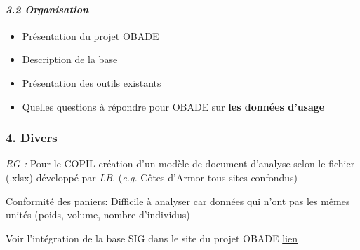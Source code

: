 \documentclass[
]{article}
\providecommand{\tightlist}{%
  \setlength{\itemsep}{0pt}\setlength{\parskip}{0pt}}
\begin{document}
\hypertarget{organisation}{%
\paragraph{\texorpdfstring{\emph{3.2
Organisation}}{3.2 Organisation}}\label{organisation}}

\begin{itemize}
\tightlist
\item
  Présentation du projet OBADE
\item
  Description de la base
\item
  Présentation des outils existants
\item
  Quelles questions à répondre pour OBADE sur \textbf{les données
  d'usage}
\end{itemize}

\hypertarget{divers}{%
\subsubsection{\texorpdfstring{\textbf{4.
Divers}}{4. Divers}}\label{divers}}

\emph{RG :} Pour le COPIL création d'un modèle de document d'analyse
selon le fichier (.xlsx) développé par \emph{LB}. (\emph{e.g.} Côtes
d'Armor tous sites confondus)

Conformité des paniers: Difficile à analyser car données qui n'ont pas
les mêmes unités (poids, volume, nombre d'individus)

Voir l'intégration de la base SIG dans le site du projet OBADE
\href{https://lizmap.afbiodiversite.fr/aamp/afb_mer/index.php/view/map/?repository=bdestampbasesig\&project=ref_met_bdestamp_ref_geo_pol}{lien}
\end{document}
